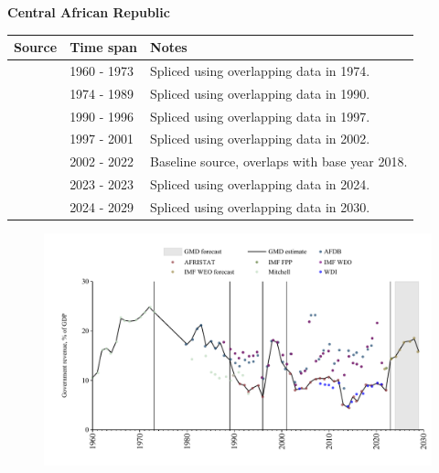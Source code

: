 \documentclass[12pt,a4paper,landscape]{article}
\begin{document}
\begin{adjustbox}{max totalsize={\paperwidth}{\paperheight},center}
\begin{minipage}[t][\textheight][t]{\textwidth}
\vspace*{0.5cm}
{}
\begin{center}
{\Large\bfseries Central African Republic}
\end{center}
\vspace{0.5cm}
\begin{table}[H]
\centering
\small
\begin{tabular}{|l|l|l|}
\hline
\textbf{Source} & \textbf{Time span} & \textbf{Notes} \\
\hline
\rowcolor{white}\cite{Mitchell}& 1960 - 1973 &Spliced using overlapping data in 1974.\\
\rowcolor{lightgray}\cite{AFDB}& 1974 - 1989 &Spliced using overlapping data in 1990.\\
\rowcolor{white}\cite{AFRISTAT}& 1990 - 1996 &Spliced using overlapping data in 1997.\\
\rowcolor{lightgray}\cite{AFDB}& 1997 - 2001 &Spliced using overlapping data in 2002.\\
\rowcolor{white}\cite{AFRISTAT}& 2002 - 2022 &Baseline source, overlaps with base year 2018.\\
\rowcolor{lightgray}\cite{IMF_FPP}& 2023 - 2023 &Spliced using overlapping data in 2024.\\
\rowcolor{white}\cite{IMF_WEO_forecast}& 2024 - 2029 &Spliced using overlapping data in 2030.\\
\hline
\end{tabular}
\end{table}
\begin{figure}[H]
\centering
\includegraphics[width=\textwidth,height=0.6\textheight,keepaspectratio]{graphs/CAF_govrev_GDP.pdf}
\end{figure}
\end{minipage}
\end{adjustbox}
\end{document}
